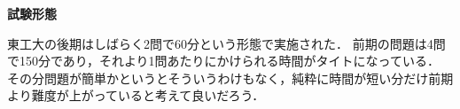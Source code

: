 \documentclass[../../main.tex]{subfiles}
\begin{document}
\noindent\textbf{試験形態}

\vspace{5mm}

東工大の後期はしばらく2問で60分という形態で実施された．
前期の問題は4問で150分であり，それより1問あたりにかけられる時間がタイトになっている．
その分問題が簡単かというとそういうわけもなく，純粋に時間が短い分だけ前期より難度が上がっていると考えて良いだろう．
\begin{center}
\end{center}
\end{document}
